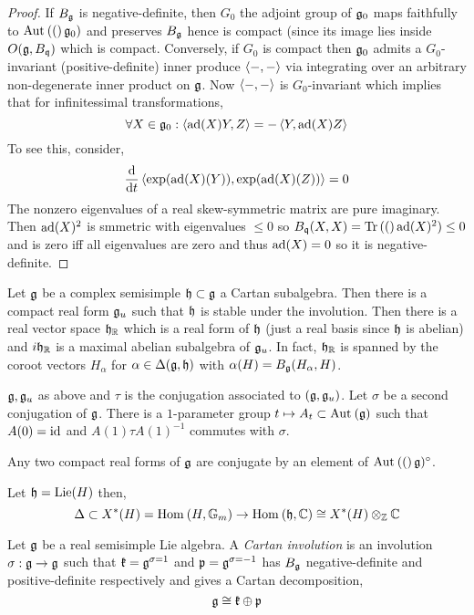 \documentclass[12pt]{article}
\begin{document}
\begin{proof}
If $B_{\mathfrak{g}}$ is negative-definite, then $G_0$ the adjoint group of $\mathfrak{g}_0$ maps faithfully to $\mathrm{Aut}_{} \left( ( \right)\mathfrak{g}_0)$ and preserves $B_{\mathfrak{g}}$ hence is compact (since its image lies inside $O(\mathfrak{g}, B_{\mathfrak{q}})$ which is compact. Conversely, if $G_0$ is compact then $\mathfrak{g}_0$ admits a $G_0$-invariant (positive-definite) inner produce $\left< - , - \right>$ via integrating over an arbitrary non-degenerate inner product on $\mathfrak{g}$. Now $\left< - , - \right>$ is $G_0$-invariant which implies that for infinitessimal transformations,
\[ \forall X \in \mathfrak{g}_0 : \left< \mathrm{ad}(X) Y , Z \right> = - \left< Y , \mathrm{ad}(X) Z \right> \]
To see this, consider,
\[ \frac{\mathrm{d}{}}{\mathrm{d}{t}} \left<  \exp(\mathrm{ad}(X)(Y)) , \exp(\mathrm{ad}(X)(Z)) \right> = 0 \]
The nonzero eigenvalues of a real skew-symmetric matrix are pure imaginary. Then $\mathrm{ad}(X)^2$ is smmetric with eigenvalues $\le 0$ so $B_{\mathfrak{q}}(X,X) = \mathrm{Tr}\left( ( \right)\mathrm{ad}(X)^2) \le 0$ and is zero iff all eigenvalues are zero and thus $\mathrm{ad}(X) = 0$ so it is negative-definite. 
\end{proof}

\begin{theorem}
Let $\mathfrak{g}$ be a complex semisimple $\mathfrak{h} \subset \mathfrak{g}$ a Cartan subalgebra. Then there is a compact real form $\mathfrak{g}_u$ such that $\mathfrak{h}$ is stable under the involution. Then there is a real vector space $\mathfrak{h}_{\mathbb{R}}$ which is a real form of $\mathfrak{h}$ (just a real basis since $\mathfrak{h}$ is abelian) and $i \mathfrak{h}_{\mathbb{R}}$ is a maximal abelian subalgebra of $\mathfrak{g}_u$. In fact, $\mathfrak{h}_{\mathbb{R}}$ is spanned by the coroot vectors $H_\alpha$ for $\alpha \in \Delta(\mathfrak{g}, \mathfrak{h})$ with $\alpha(H) = B_{\mathfrak{g}}(H_\alpha, H)$. 
\end{theorem}

\begin{theorem}
$\mathfrak{g}, \mathfrak{g}_u$ as above and $\tau$ is the conjugation associated to $(\mathfrak{g}, \mathfrak{g}_u)$. Let $\sigma$ be a second conjugation of $\mathfrak{g}$. There is a $1$-parameter group $t \mapsto A_t \subset \mathrm{Aut}_{} \left( \mathfrak{g} \right)$ such that $A(0) = \mathrm{id}$ and $A(1) \tau A(1)^{-1}$ commutes with $\sigma$. 
\end{theorem}

\begin{cor}
Any two compact real forms of $\mathfrak{g}$ are conjugate by an element of $\mathrm{Aut}_{} \left( ( \right)\mathfrak{g})^\circ$. 
\end{cor}

\begin{rmk}
Let $\mathfrak{h} = \mathrm{Lie}(H)$ then,
\[ \Delta \subset X^*(H) = \mathrm{Hom}_{} \left( H, \mathbb{G}_m \right) \to \mathrm{Hom}_{} \left( \mathfrak{h}, \mathbb{C} \right) \cong X^*(H) \otimes_{\mathbb{Z}} \mathbb{C} \]
\end{rmk}

\begin{defn}
Let $\mathfrak{g}$ be a real semisimple Lie algebra. A \textit{Cartan involution} is an involution $\sigma : \mathfrak{g} \to \mathfrak{g}$ such that $\mathfrak{k} = \mathfrak{g}^{\sigma = 1}$ and $\mathfrak{\mathfrak{p}} = \mathfrak{g}^{\sigma = -1}$ has $B_{\mathfrak{g}}$ negative-definite and positive-definite respectively and gives a Cartan decomposition,
\[ \mathfrak{g} \cong \mathfrak{k} \oplus \mathfrak{p} \]
\end{defn}
\end{document}
